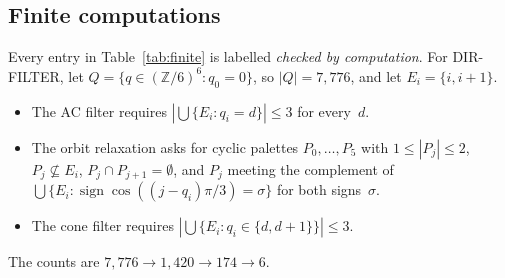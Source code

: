 \documentclass[11pt]{article}
\theoremstyle{definition}
\theoremstyle{remark}
\begin{document}
\subsection{Finite computations}

Every entry in Table~\ref{tab:finite} is labelled \emph{checked by
computation}. For DIR-FILTER, let $Q=\{q\in(\mathbb{Z}/6)^6: q_0=0\}$, so
$|Q|=7{,}776$, and let $E_i=\{i,i+1\}$.
\begin{itemize}
\item The AC filter requires $|\bigcup\{E_i: q_i=d\}|\le 3$ for every~$d$.
\item The orbit relaxation asks for cyclic palettes $P_0,\dots,P_5$ with
$1\le|P_j|\le 2$, $P_j\not\subseteq E_i$, $P_j\cap P_{j+1}=\emptyset$, and
$P_j$ meeting the complement of $\bigcup\{E_i:\operatorname{sign}\cos((j-q_i)\pi/3)=\sigma\}$
for both signs~$\sigma$.
\item The cone filter requires $|\bigcup\{E_i:q_i\in\{d,d+1\}\}|\le 3$.
\end{itemize}
The counts are $7{,}776\to1{,}420\to174\to6$.
\end{document}
